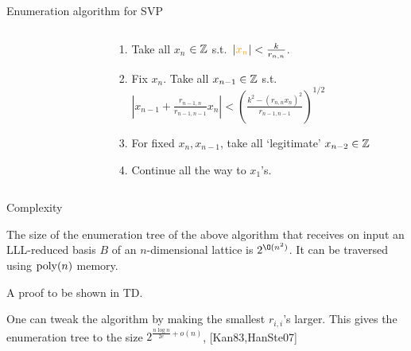 \documentclass[usenames,dvipsnames, 9pt, aspectratio=169]{beamer}
\begin{document}
\begin{frame}{Enumeration algorithm for SVP}
\begin{columns}[t]
\begin{column}{0.3\textwidth}
%
	\end{column}%
	\begin{column}{0.1\textwidth}
	\end{column}
	\begin{column}{0.65\textwidth}
		\Large
		\vspace{-5pt} 
		\begin{enumerate}[<+->]
		\itemsep 8pt
		\item Take all {\color{Orange}$x_n$}  $\in {{\mathbb Z}}$ s.t.\ $|{\color{Orange} x_n}| < \frac{k} {r_{n,n}}$. 
		\item Fix $x_n$. Take all $x_{n-1} \in {{\mathbb Z}}$ s.t.\ \\  $\left|{x_{n-1} + \frac{r_{n-1,n}}{r_{n-1,n-1}}x_n }\right| < \left( \frac{k^2-(r_{n,n}x_n )^2}{r_{n-1, n-1}}\right)^{1/2}$ 
		\item For fixed $x_n, x_{n-1}$, take all `legitimate' $x_{n-2} \in {{\mathbb Z}}$ 
		\item Continue all the way to $x_1$'s.
	\end{enumerate}
	\end{column}
	
\end{columns}

\end{frame}

\begin{frame}{Complexity}
	\Large
	\begin{theorem} The size of the enumeration tree of the above algorithm that receives on input an LLL-reduced basis $B$ of an $n$-dimensional lattice	is $2^{\O(n^2)}$. It can be traversed using $\mathrm{poly}(n)$ memory.
	\end{theorem}

A proof to be shown in TD.

\vspace{15pt}

One can tweak the algorithm by making the smallest $r_{i,i}$'s larger. This gives the enumeration tree to the size $2^{\frac{n \log n}{2e}+o(n)}$, {\color{Orange}[Kan83,HanSte07] }


\end{frame}
\end{document}
